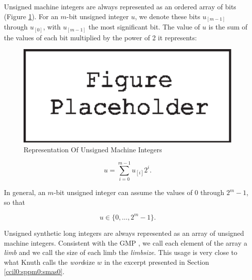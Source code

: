 Unsigned machine integers are always represented as an ordered 
array of bits (Figure \ref{fig:ccil0:sroi0:srou0:00}).  For an
$m$-bit unsigned integer $u$, we denote these bits $u_{[m-1]}$ through
$u_{[0]}$, with $u_{[m-1]}$ the most significant bit.  The value
of $u$ is the sum of the values of each bit multiplied
by the power of 2 it represents:

\begin{figure}
\centering
\includegraphics[width=4.6in]{c_cil0/uintrep1.eps}
\caption{Representation Of Unsigned Machine Integers}
\label{fig:ccil0:sroi0:srou0:00}
\end{figure}

\begin{equation}
\label{eq:ccil0:sroi0:srou0:00}
u = \sum_{i=0}^{m-1} u_{[i]} 2^i .
\end{equation}

In general, an $m$-bit unsigned integer can assume the values of 
0 through $2^m - 1$, so that

\begin{equation}
\label{eq:ccil0:sroi0:srou0:01}
u \in \{0, \ldots{} , 2^m - 1 \} .
\end{equation}

Unsigned synthetic long integers are always represented as an array
of unsigned machine integers.  
Consistent with the GMP \cite{bibref:s:gnumultipleprecisionarithmeticlibrary},
we call each element of the array a \emph{limb} and we call the size of
each limb the \emph{limbsize}.  This usage is very close to what Knuth
calls the \emph{word}size $w$ in the excerpt presented in 
Section \ref{ccil0:sppm0:smas0}.

